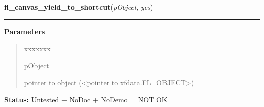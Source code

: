    \label{xformslib:library:fl_canvas_yield_to_shortcut}

    \vspace{0.5ex}

\hspace{.8\funcindent}\begin{boxedminipage}{\funcwidth}

    \raggedright \textbf{fl\_canvas\_yield\_to\_shortcut}(\textit{pObject}, \textit{yes})

    \vspace{-1.5ex}

    \rule{\textwidth}{0.5\fboxrule}
\setlength{\parskip}{2ex}
\setlength{\parskip}{1ex}
      \textbf{Parameters}
      \vspace{-1ex}

      \begin{quote}
        \begin{Ventry}{xxxxxxx}

          \item[pObject]

          pointer to object ({\textless}pointer to 
          xfdata.FL\_OBJECT{\textgreater})

        \end{Ventry}

      \end{quote}

\textbf{Status:} Untested + NoDoc + NoDemo = NOT OK



    \end{boxedminipage}

    \label{xformslib:library:fl_add_glcanvas}

    \vspace{0.5ex}

